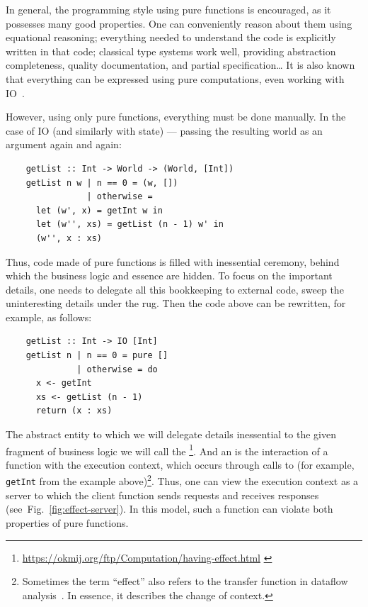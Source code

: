 
In general, the programming style using pure functions is encouraged, as it possesses many good properties.
One can conveniently reason about them using equational reasoning; everything needed to understand the code is explicitly written in that code; classical type systems work well, providing abstraction completeness, quality documentation, and partial specification\ldots
It is also known that everything can be expressed using pure computations, even working with IO~\cite{jones2001tackling}.

However, using only pure functions, everything must be done manually.
In the case of IO (and similarly with state) --- passing the resulting world as an argument again and again:
\begin{verbatim}
    getList :: Int -> World -> (World, [Int])
    getList n w | n == 0 = (w, [])
                | otherwise =
      let (w', x) = getInt w in
      let (w'', xs) = getList (n - 1) w' in
      (w'', x : xs)
\end{verbatim}

Thus, code made of pure functions is filled with inessential ceremony, behind which the business logic and essence are hidden.
To focus on the important details, one needs to delegate all this bookkeeping to external code, sweep the uninteresting details under the rug.
Then the code above can be rewritten, for example, as follows:
\begin{verbatim}
    getList :: Int -> IO [Int]
    getList n | n == 0 = pure []
              | otherwise = do
      x <- getInt
      xs <- getList (n - 1)
      return (x : xs)
\end{verbatim}

The abstract entity to which we will delegate details inessential to the given fragment of business logic we will call the \footnote{\url{https://okmij.org/ftp/Computation/having-effect.html} \label{lab:having-effect}}.
And an  is the interaction of a function with the execution context, which occurs through calls to  (for example, \texttt{getInt} from the example above)\footnote{Sometimes the term ``effect'' also refers to the transfer function in dataflow analysis~\cite{moller2012static}. In essence, it describes the change of context.}. %
Thus, one can view the execution context as a server to which the client function sends requests and receives responses (see\ Fig.\ \ref{fig:effect-server}).
In this model, such a function can violate both properties of pure functions.

